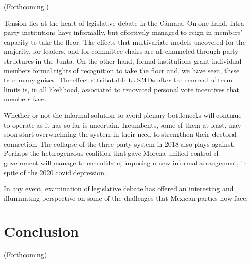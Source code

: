 \documentclass[letter,12pt]{article}
\begin{document}
(Forthcoming.)

Tension lies at the heart of legislative debate in the Cámara. On one hand, intra-party institutions have informally, but effectively managed to reign in members' capacity to take the floor. The effects that multivariate models uncovered for the majority, for leaders, and for committee chairs are all channeled through party structures in the Junta. On the other hand, formal institutions grant individual members formal rights of recognition to take the floor and, we have seen, these take many guises. The effect attributable to SMDs after the removal of term limits is, in all likelihood, associated to renovated personal vote incentives that members face. 

Whether or not the informal solution to avoid plenary bottlenecks will continue to operate as it has so far is uncertain. Incumbents, some of them at least, may soon start overwhelming the system in their need to strengthen their electoral connection. The collapse of the three-party system in 2018 also plays against. Perhaps the heterogeneous coalition that gave Morena unified control of government will manage to consolidate, imposing a new informal arrangement, in spite of the 2020 covid depression.

In any event, examination of legislative debate has offered an interesting and illuminating perspective on some of the challenges that Mexican parties now face.   

\section{Conclusion} %

(Forthcoming)








\end{document}
